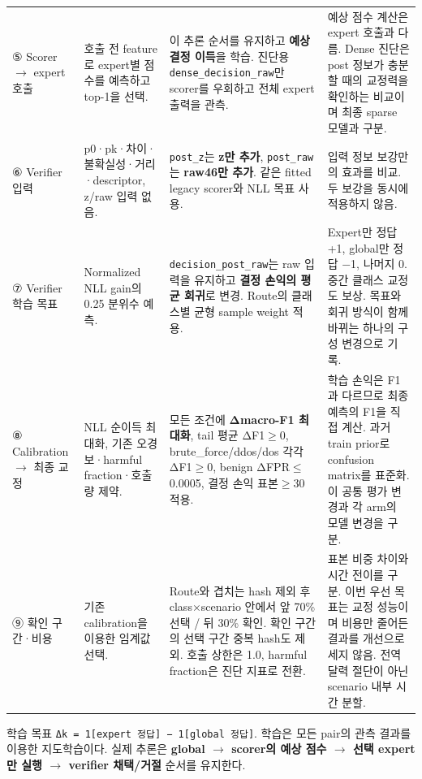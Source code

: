 \begin{longtable}
{}⑤ Scorer  \ensuremath{\rightarrow}  expert 호출 & 호출 전 feature로 expert별 점수를 예측하고 top-1을 선택. & 이 추론 순서를 유지하고 \textbf{예상 결정 이득}을 학습. 진단용 \texttt{dense\_\allowbreak{}\allowbreak{}de\allowbreak{}cision\_\allowbreak{}\allowbreak{}r\allowbreak{}aw}만 scorer를 우회하고 전체 expert 출력을 관측. & 예상 점수 계산은 expert 호출과 다름. Dense 진단은 post 정보가 충분할 때의 교정력을 확인하는 비교이며 최종 sparse 모델과 구분. \\
{}⑥ Verifier 입력 & p0·pk·차이·불확실성·거리·descriptor, z/\allowbreak{}raw 입력 없음. & \texttt{post\_\allowbreak{}\allowbreak{}z}는 \textbf{z만 추가}, \texttt{post\_\allowbreak{}\allowbreak{}raw\allowbreak{}}는 \textbf{raw46만 추가}. 같은 fitted legacy scorer와 NLL 목표 사용. & 입력 정보 보강만의 효과를 비교. 두 보강을 동시에 적용하지 않음. \\
{}⑦ Verifier 학습 목표 & Normalized NLL gain의 0.25 분위수 예측. & \texttt{decision\allowbreak{}\_\allowbreak{}\allowbreak{}post\_\allowbreak{}\allowbreak{}ra\allowbreak{}w}는 raw 입력을 유지하고 \textbf{결정 손익의 평균 회귀}로 변경. Route의 클래스별 균형 sample weight 적용. & Expert만 정답 +\allowbreak{}1, global만 정답 −1, 나머지 0. 중간 클래스 교정도 보상. 목표와 회귀 방식이 함께 바뀌는 하나의 구성 변경으로 기록. \\
{}⑧ Calibration  \ensuremath{\rightarrow}  최종 교정 & NLL 순이득 최대화, 기존 오경보·harmful fraction·호출량 제약. & 모든 조건에 \textbf{Δmacro-F1 최대화}, tail 평균 ΔF1\ensuremath{\geq}0, brute\_\allowbreak{}force/\allowbreak{}ddos/\allowbreak{}dos 각각 ΔF1\ensuremath{\geq}0, benign ΔFPR\ensuremath{\leq}0.0005, 결정 손익 표본\ensuremath{\geq}30 적용. & 학습 손익은 F1과 다르므로 최종 예측의 F1을 직접 계산. 과거 train prior로 confusion matrix를 표준화. 이 공통 평가 변경과 각 arm의 모델 변경을 구분. \\
{}⑨ 확인 구간·비용 & 기존 calibration을 이용한 임계값 선택. & Route와 겹치는 hash 제외 후 class×scenario 안에서 앞 70\% 선택 /\allowbreak{} 뒤 30\% 확인. 확인 구간의 선택 구간 중복 hash도 제외. 호출 상한은 1.0, harmful fraction은 진단 지표로 전환. & 표본 비중 차이와 시간 전이를 구분. 이번 우선 목표는 교정 성능이며 비용만 줄어든 결과를 개선으로 세지 않음. 전역 달력 절단이 아닌 scenario 내부 시간 분할. \\
\bottomrule
\end{longtable}
\endgroup
학습 목표 \texttt{Δk =\allowbreak{}\allowbreak{} 1[e\allowbreak{}xpert 정답\allowbreak{}] − 1[gl\allowbreak{}obal 정답]\allowbreak{}}. 학습은 모든 pair의 관측 결과를 이용한 지도학습이다. 실제 추론은 \textbf{global  \ensuremath{\rightarrow}  scorer의 예상 점수  \ensuremath{\rightarrow}  선택 expert만 실행  \ensuremath{\rightarrow}  verifier 채택/\allowbreak{}거절} 순서를 유지한다.

